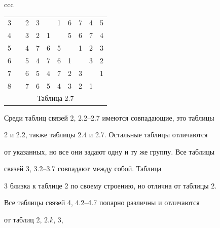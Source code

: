 \begin{center}
\begin{tabular}{ccc}
\begin{tabular}{cccccccccc}
3 & \vline & 2 & 3 & \ & 1 & 6 & 7 & 4 & 5 \\


4 & \vline & 3 & 2 & 1 & \ & 5 & 6 & 7 & 4 \\


5 & \vline & 4 & 7 & 6 & 5 & \ & 1 & 2 & 3 \\


6 & \vline & 5 & 4 & 7 & 6 & 1 & \ & 3 & 2 \\


7 & \vline & 6 & 5 & 4 & 7 & 2 & 3 & \ & 1 \\


8 & \vline & 7 & 6 & 5 & 4 & 3 & 2 & 1 & \ \\


\multicolumn{10}{c}{ Таблица 2.7}


\end{tabular}





\end{tabular}


\end{center}


\smallskip








Среди таблиц связей 2, 2.2--2.7 имеются совпадающие, это таблицы 


2 и 2.2, также таблицы 2.4 и 2.7. Остальные таблицы отличаются


от указанных, но все они задают одну и ту же группу. Все таблицы 


связей 3, 3.2--3.7 совпадают между собой. Таблица


3 близка к таблице 2 по своему строению, но отлична от таблицы 2.


Все таблицы связей 4, 4.2--4.7 попарно различны и отличаются


от таблиц 2, $2.k$, 3,


\smallskip





